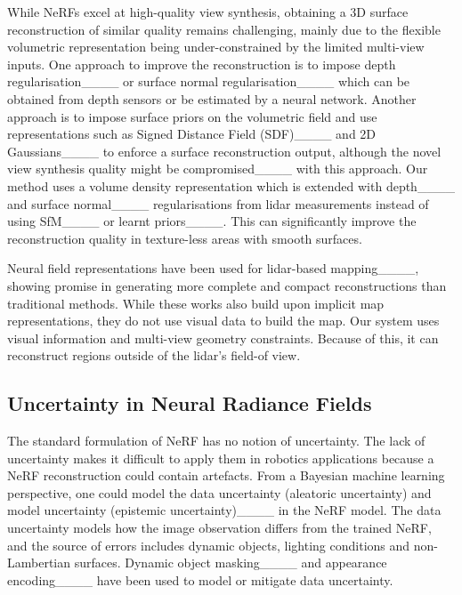 While NeRFs excel at high-quality view synthesis, obtaining a 3D surface reconstruction of similar quality remains challenging, mainly due to the flexible volumetric representation being under-constrained by the limited multi-view inputs. One approach to improve the reconstruction is to impose depth regularisation____ or surface normal regularisation____ which can be obtained from depth sensors or be estimated by a neural network.
Another approach is to impose surface priors on the volumetric field and use 
representations such as Signed Distance Field (SDF)____ and 2D Gaussians____ to enforce a surface reconstruction output, although the novel view synthesis quality might be compromised____ with this approach. 
Our method uses a volume density representation which is extended with depth____ and surface normal____ regularisations from lidar measurements instead of using SfM____ or learnt priors____. This can significantly improve the reconstruction quality in texture-less areas with smooth surfaces.


Neural field representations have been used for lidar-based mapping____, showing promise in generating more complete and compact reconstructions than traditional methods. While these works also build upon implicit map representations, they do not use visual data to build the map. Our system uses visual information and multi-view geometry constraints. Because of this, it can reconstruct regions outside of the lidar's field-of view.

\subsection{Uncertainty in Neural Radiance Fields}
The standard formulation of NeRF has no notion of uncertainty. The lack of uncertainty makes it difficult to apply them in robotics applications because a NeRF reconstruction could contain artefacts. From a Bayesian machine learning perspective, one could model the data uncertainty (aleatoric uncertainty) and model uncertainty (epistemic uncertainty)____ in the NeRF model. The data uncertainty models how the image observation differs from the trained NeRF, and the source of errors includes dynamic objects, lighting conditions and non-Lambertian surfaces. Dynamic object masking____ and appearance encoding____ have been used to model or mitigate data uncertainty.

